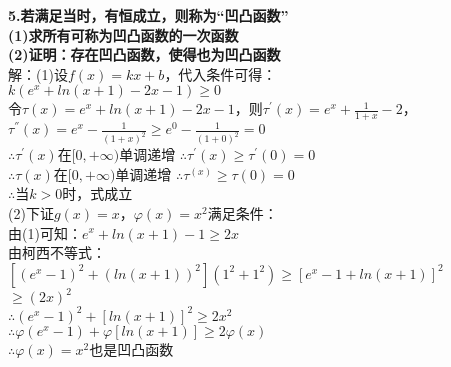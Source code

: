 \documentclass{article}
\begin{document}
    \newpage
    \noindent \textbf{5.若满足当时，有恒成立，则称为“凹凸函数” \\
    (1)求所有可称为凹凸函数的一次函数 \\
    (2)证明：存在凹凸函数，使得也为凹凸函数} \\
    解：(1)设$f(x)=kx+b$，代入条件可得：\\
    \hspace*{1.7cm} $k\left(e^{x}+ln(x+1)-2x-1\right)\geqslant 0$\quad{} \\
    令$\tau (x)=e^x+ln(x+1)-2x-1$，则$\tau^{'} (x)=e^x+\frac{1}{1+x}-2$， \\
    $\tau^{''}(x)=e^x-\frac{1}{(1+x)^2}\geqslant e^0-\frac{1}{(1+0)^2}=0$ \\
    $\therefore $\quad $\tau^{'}(x)$在$[0,+\infty )$单调递增 \qquad $\therefore $\quad $\tau^{'}(x)\geqslant \tau^{'}(0)=0$ \\
    $\therefore $\quad $\tau(x)$在$[0,+\infty )$单调递增 \qquad $\therefore $\quad $\tau^(x)\geqslant \tau(0)=0$ \\
    $\therefore $\quad 当$k>0$时，式成立 \\
    (2)下证$g(x)=x$，$\varphi (x)=x^2$满足条件： \\
    由(1)可知：$e^{x}+ln(x+1)-1\geqslant 2x$ \\
    由柯西不等式：$\left[\left(e^{x}-1\right)^2+\left(ln(x+1)\right)^2\right]\left(1^{2}+1^{2}\right)\geqslant \left[e^{x}-1+ln(x+1)\right]^2$ \\
    \hspace*{11.5cm} $\geqslant \left(2x\right)^2$ \\
    $\therefore $\quad $\left(e^{x}-1\right)^2+\left[ln(x+1)\right]^2\geqslant 2x^2$ \\
    $\therefore $\quad $\varphi (e^{x}-1)+\varphi [ln(x+1)]\geqslant 2\varphi (x)$ \\
    $\therefore $\quad $\varphi (x)=x^2$也是凹凸函数 \\
\end{document}
